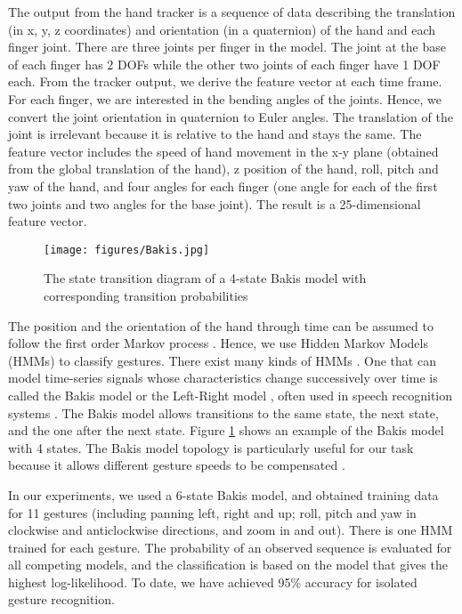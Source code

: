 The output from the hand tracker is a sequence of data describing the translation (in x, y, z coordinates) and orientation (in a quaternion) of the hand and each finger joint. There are three joints per finger in the model. The joint at the base of each finger has 2 DOFs while the other two joints of each finger have 1 DOF each. From the tracker output, we derive the feature vector at each time frame. For each finger, we are interested in the bending angles of the joints. Hence, we convert the joint orientation in quaternion to Euler angles. The translation of the joint is irrelevant because it is relative to the hand and stays the same. The feature vector includes the speed of hand movement in the x-y plane (obtained from the global translation of the hand), z position of the hand, roll, pitch and yaw of the hand, and four angles for each finger (one angle for each of the first two joints and two angles for the base joint). The result is a 25-dimensional feature vector.

\begin{figure}[htp]
\begin{center}
\texttt{[image: figures/Bakis.jpg]}
\caption{{The state transition diagram of a 4-state Bakis model with corresponding transition probabilities}}\label{fig:bakis}
\end{center}
\end{figure}

The position and the orientation of the hand through time can be assumed to follow the first order Markov process \cite{Starner95}. Hence, we use Hidden Markov Models (HMMs) to classify gestures. There exist many kinds of HMMs \cite{Rabiner86}. One that can model time-series signals whose characteristics change successively over time is called the Bakis model \cite{Bauer00} or the Left-Right model \cite{Rabiner90}, often used in speech recognition systems \cite{Bauer00}. The Bakis model allows transitions to the same state, the next state, and the one after the next state.  Figure \ref{fig:bakis} shows an example of the Bakis model with 4 states. The Bakis model topology is particularly useful for our task because it allows different gesture speeds to be compensated \cite{Bauer00}.
	
In our experiments, we used a 6-state Bakis model, and obtained training data for 11 gestures (including panning left, right and up; roll, pitch and yaw in clockwise and anticlockwise directions, and zoom in and out). There is one HMM trained for each gesture. The probability of an observed sequence is evaluated for all competing models, and the classification is based on the model that gives the highest log-likelihood. To date, we have achieved 95\% accuracy for isolated gesture recognition. 

